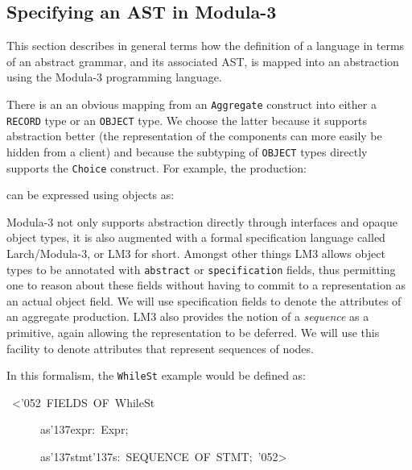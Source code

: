 {{\subsection{Specifying an AST in Modula-3}
\par
This section describes in general terms how the definition of a
language in terms of an abstract grammar, and its associated AST, is
mapped into an abstraction using the Modula-3 programming language.
\par
There is an an obvious mapping from an {\tt Aggregate} construct into
either a {\tt RECORD} type or an {\tt OBJECT} type. We choose the latter
because it supports abstraction better (the representation of
the components can more easily be hidden from a client) and
because the subtyping of {\tt OBJECT} types directly supports the
{\tt Choice} construct. For example, the production:
\par
\par{}\noindent\par
\medskip\noindent%
can be expressed using objects as:
\par
\par{}\noindent\par
\medskip\noindent%
Modula-3 not only supports abstraction directly through interfaces and
opaque object types, it is also augmented with a formal specification
language called Larch/Modula-3, or LM3 for short. Amongst other things
LM3 allows object types to be annotated with {\tt abstract} or
{\tt specification} fields, thus permitting one to reason about these fields
without having to commit to a representation as an actual object
field. We will use specification fields to denote the attributes of an
aggregate production. LM3 also provides the notion of a {\it sequence}
as a primitive, again allowing the representation to be deferred.  We
will use this facility to denote attributes that represent sequences
of nodes.
\par
In this formalism, the {\tt WhileSt} example would be defined as:
\par
\par{}\noindent\par
{\display ~<\char'052{}~FIELDS~OF~WhileSt}\noindent\par
{\display ~~~~~~as\char'137{}expr:~Expr;}\noindent\par
{\display ~~~~~~as\char'137{}stmt\char'137{}s:~SEQUENCE~OF~STMT;~\char'052{}>}\noindent\par
}}
